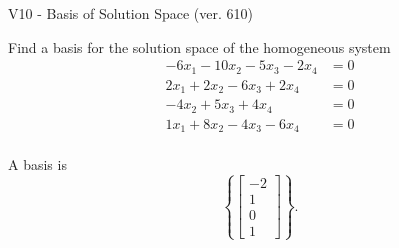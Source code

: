 \begin{exercise}
  \begin{exerciseTitle}V10 - Basis of Solution Space (ver. 610)\end{exerciseTitle}
  \begin{exerciseStatement}
    Find a basis for the solution space of the homogeneous system 
\begin{align*}
 -6 x_ 1 -10 x_ 2 -5 x_ 3 -2 x_ 4 &= 0  \\ 
  2 x_ 1 + 2 x_ 2 -6 x_ 3 + 2 x_ 4 &= 0  \\ 
  -4 x_ 2 + 5 x_ 3 + 4 x_ 4 &= 0  \\ 
  1 x_ 1 + 8 x_ 2 -4 x_ 3 -6 x_ 4 &= 0  \\ 
 \end{align*}


 
  \end{exerciseStatement}

  \begin{exerciseAnswer}
   A basis is   
\[\left\{\left[\begin{array}{c}
-2 \\
1 \\
0 \\
1
\end{array}\right]\right\}.\]

  


  \end{exerciseAnswer}
\end{exercise}